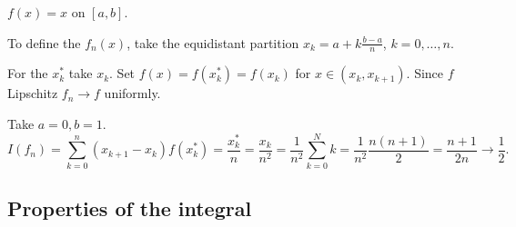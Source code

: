 \documentclass[10pt, a4paper]{article}
\begin{document}
\begin{example}
    $f(x) = x$ on $[a, b]$.
    
    To define the $f_n(x)$,
    take the equidistant partition $x_k = a + k\frac{b - a}{n}$,
    $k = 0, \dotsc, n$.

    For the $x_k ^ {*}$ take $x_k$.
    Set $f(x) = f(x_k ^ {*}) = f(x_k)$ for $x \in (x_k, x_{k + 1})$.
    Since $f$ Lipschitz $f_n \to f$ uniformly.

    Take $a = 0, b = 1$.
    \[
    I(f_n) = \sum_{k = 0}^{n}(x_{k + 1} - x_k)f(x_k ^ {*}) = \frac{x_k ^ {*}}{n} = \frac{x_k}{n ^ 2} = \frac{1}{n ^ 2}\sum_{k = 0}^{N}k = \frac{1}{n ^ 2}\frac{n(n + 1)}{2} = \frac{n + 1}{2n} \to \frac{1}{2}.
    \]
\end{example}

\subsection{Properties of the integral}
\end{document}
